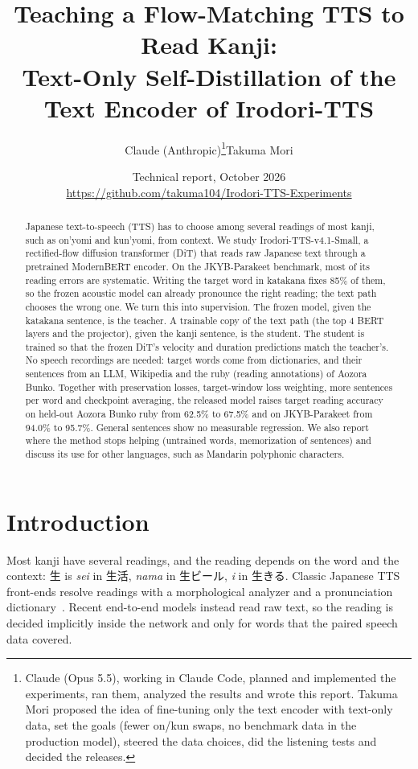 \documentclass[10pt,a4paper,twocolumn]{article}
\title{\bfseries Teaching a Flow-Matching TTS to Read Kanji:\\
Text-Only Self-Distillation of the Text Encoder of Irodori-TTS}
\author{Claude (Anthropic)\thanks{Claude (Opus 5.5), working in Claude Code, planned and implemented
the experiments, ran them, analyzed the results and wrote this report. Takuma Mori proposed the idea of
fine-tuning only the text encoder with text-only data, set the goals (fewer on/kun swaps, no benchmark
data in the production model), steered the data choices, did the listening tests and decided the
releases.}\qquad Takuma Mori}
\date{{\small Technical report, October 2026}\\
{\small\url{https://github.com/takuma104/Irodori-TTS-Experiments}}}
\begin{document}
\maketitle

\begin{abstract}
Japanese text-to-speech (TTS) has to choose among several readings of most kanji, such as
on'yomi and kun'yomi, from context. We study Irodori-TTS-v4.1-Small, a rectified-flow
diffusion transformer (DiT) that reads raw Japanese text through a pretrained ModernBERT
encoder. On the JKYB-Parakeet benchmark, most of its reading errors are systematic. Writing
the target word in katakana fixes 85\% of them, so the frozen acoustic model can already
pronounce the right reading; the text path chooses the wrong one. We turn this into
supervision. The frozen model, given the katakana sentence, is the teacher. A trainable copy
of the text path (the top 4 BERT layers and the projector), given the kanji sentence, is the
student. The student is trained so that the frozen DiT's velocity and duration predictions
match the teacher's. No speech recordings are needed: target words come from dictionaries,
and their sentences from an LLM, Wikipedia and the ruby (reading annotations) of Aozora Bunko.
Together with preservation losses, target-window loss weighting, more sentences per word and
checkpoint averaging, the released model raises target reading accuracy on held-out Aozora
Bunko ruby from 62.5\% to 67.5\% and on JKYB-Parakeet from 94.0\% to 95.7\%. General sentences
show no measurable regression. We also report where the method stops helping (untrained
words, memorization of sentences) and discuss its use for other languages, such as Mandarin
polyphonic characters.
\end{abstract}

\section{Introduction}
Most kanji have several readings, and the reading depends on the word and the context:
生 is \emph{sei} in 生活, \emph{nama} in 生ビール, \emph{i} in 生きる. Classic
Japanese TTS front-ends resolve readings with a morphological analyzer and a pronunciation
dictionary~\cite{mecab,unidic,sudachi}. Recent end-to-end models instead read raw text, so the
reading is decided implicitly inside the network and only for words that the paired speech
data covered.
\end{document}
